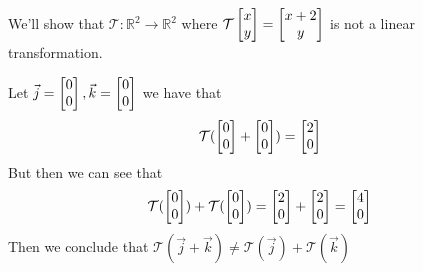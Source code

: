 \documentclass[11pt]{book}
\begin{document}
\begin{eg}
    We'll show that $\mathcal{T} : \mathbb{R}^2 \to \mathbb{R}^2 $ where
    $\mathcal{T} \begin{bmatrix} x \\ y \end{bmatrix} = \begin{bmatrix} x + 2 \\ y \end{bmatrix}$ is not a linear
    transformation.

    Let $\vec{j} = \begin{bmatrix} 0 \\ 0 \end{bmatrix}, \vec{k} = \begin{bmatrix} 0 \\ 0 \end{bmatrix}$ we have that
    \begin{equation*}
        \mathcal{T}(\begin{bmatrix} 0 \\ 0 \end{bmatrix} + \begin{bmatrix} 0 \\ 0 \end{bmatrix}) = \begin{bmatrix} 2 \\ 0 \end{bmatrix}       
    \end{equation*}
    But then we can see that 
    \begin{equation*}
        \mathcal{T}(\begin{bmatrix} 0 \\ 0 \end{bmatrix}) + \mathcal{T}(\begin{bmatrix} 0 \\ 0 \end{bmatrix}) = \begin{bmatrix} 2 \\ 0
        \end{bmatrix} + \begin{bmatrix} 2 \\ 0 \end{bmatrix} = \begin{bmatrix} 4 \\ 0 \end{bmatrix}         
    \end{equation*}
    Then we conclude that $\mathcal{T}(\vec{j} + \vec{k}) \neq
    \mathcal{T}(\vec{j}) + \mathcal{T}(\vec{k})$ 
\end{eg}
\end{document}
